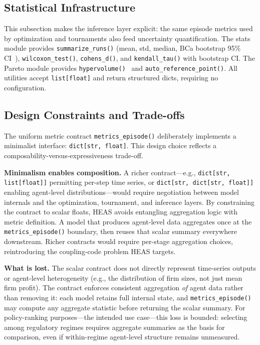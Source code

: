 \documentclass{wscpaperproc}
\begin{document}
\subsection{Statistical Infrastructure}

This subsection makes the inference layer explicit: the same episode metrics
used by optimization and tournaments also feed uncertainty quantification.
The stats module provides \texttt{summarize\_runs()} (mean, std, median, BCa
bootstrap 95\% CI~\cite{efron1994bootstrap}), \texttt{wilcoxon\_test()},
\texttt{cohens\_d()}, and \texttt{kendall\_tau()} with bootstrap CI.
The Pareto module provides \texttt{hypervolume()}~\cite{zitzler1998hypervolume}
and \texttt{auto\_reference\_point()}. All utilities accept \texttt{list[float]}
and return structured dicts, requiring no configuration.

\subsection{Design Constraints and Trade-offs}
\label{sec:design-constraints}

The uniform metric contract \texttt{metrics\_episode()} deliberately implements
a minimalist interface: \texttt{dict[str, float]}. This design choice reflects a
composability-versus-expressiveness trade-off.

\textbf{Minimalism enables composition.} A richer contract---e.g.,
\texttt{dict[str, list[float]]} permitting per-step time series, or
\texttt{dict[str, dict[str, float]]} enabling agent-level distributions---would
require negotiation between model internals and the optimization, tournament, and
inference layers. By constraining the contract to scalar floats, HEAS avoids
entangling aggregation logic with metric definition. A model that produces
agent-level data aggregates once at the \texttt{metrics\_episode()} boundary, then
reuses that scalar summary everywhere downstream. Richer contracts would require
per-stage aggregation choices, reintroducing the coupling-code problem HEAS targets.


\textbf{What is lost.} The scalar contract does not directly represent time-series
outputs or agent-level heterogeneity (e.g., the distribution of firm sizes, not
just mean firm profit). The contract enforces consistent aggregation \emph{of} agent data rather than removing it: each model retains full internal state, and \texttt{metrics\_episode()} may compute any aggregate statistic before returning the scalar summary. For policy-ranking purposes---the intended use case---this
loss is bounded: selecting among regulatory regimes requires aggregate summaries
as the basis for comparison, even if within-regime agent-level structure remains
unmeasured.
\end{document}
